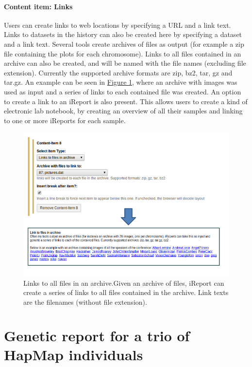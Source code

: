 \paragraph*{Content item: Links}
Users can create links to web locations by specifying a URL and a link text. Links to datasets in the history can also be created here by specifying a dataset and a link text. Several tools create archives of files as output (for example a zip file containing the plots for each chromosome). Links to all files contained in an archive can also be created, and will be named with the file names (excluding file extension). Currently the supported archive formats are zip, bz2, tar, gz and tar.gz. An example can be seen in \hyperref[fig:archivelinks]{Figure \ref*{fig:archivelinks}}, where an archive with images was used as input and a series of links to each contained file was created. An option to create a link to an iReport is also present. This allows users to create a kind of electronic lab notebook, by creating an overview of all their samples and linking to one or more iReports for each sample.

\begin{figure}[h!]
    \includegraphics[width=\textwidth]{chapters/images/iReport/Hiltemann_archivelinks.jpg}
    \caption{Links to all files in an archive.Given an archive of files, iReport can create a series of links to all files contained in the archive. Link texts are the filenames (without file extension).}
    \label{fig:archivelinks}
\end{figure}

\section*{Genetic report for a trio of HapMap individuals}

